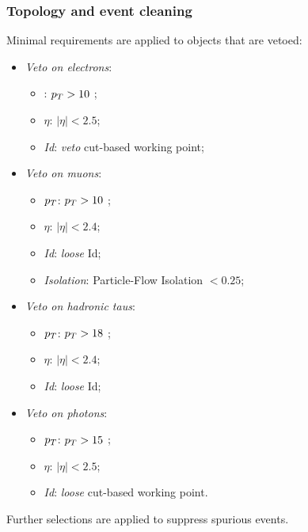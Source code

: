 \subsubsection{Topology and event cleaning}
Minimal requirements are applied to objects that are vetoed:%
\begin{itemize}
     \item \textit{Veto on electrons}:
	\begin{itemize}
	\item \textit{\pt}: $p_T>10$ \GeV;
	\item \textit{${\eta}$}: $|\eta|<2.5$;
	\item \textit{Id}: \emph{veto} cut-based working point;
	\end{itemize}
     \item \textit{Veto on muons}:
	\begin{itemize}
	\item \textit{${p_T}$}: $p_T>10$ \GeV;
	\item \textit{${\eta}$}: $|\eta|<2.4$;
	\item \textit{Id}: \emph{loose} Id;
	\item \textit{Isolation}: Particle-Flow Isolation $<0.25$;
	\end{itemize}
     \item \textit{Veto on hadronic taus}: 
	\begin{itemize}
	\item \textit{${p_T}$}: $p_T>18$ \GeV;
	\item \textit{${\eta}$}: $|\eta|<2.4$;
	\item \textit{Id}: \emph{loose} Id;
	\end{itemize}
     \item \textit{Veto on photons}:
	\begin{itemize}
	\item \textit{${p_T}$}: $p_T>15$ \GeV;
	\item \textit{${\eta}$}: $|\eta|<2.5$;
	\item \textit{Id}: \emph{loose} cut-based working point.
	\end{itemize}  
\end{itemize}
 
\noindent Further selections are applied to suppress spurious events.

